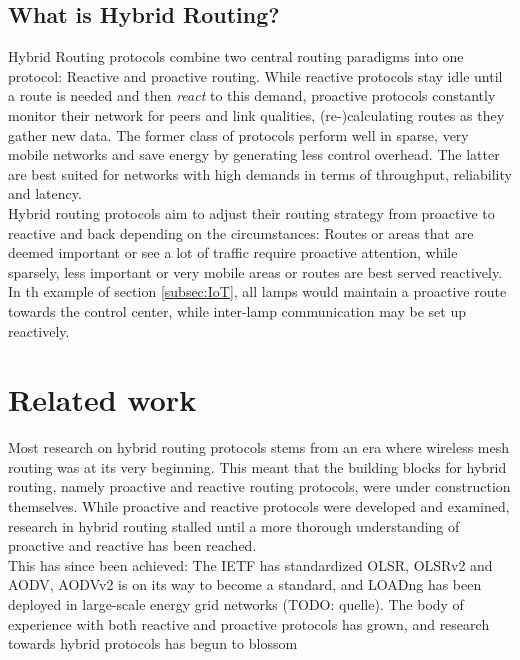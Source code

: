 \documentclass[a4paper,10pt]{scrartcl}
\begin{document}
\subsection{What is Hybrid Routing?}
\label{subsec:hybrid}
Hybrid Routing protocols combine two central routing paradigms into one protocol: Reactive and proactive routing. While reactive protocols stay idle until a route is needed and then \emph{react} to this demand, proactive protocols constantly monitor their network for peers and link qualities, (re-)calculating routes as they gather new data. The former class of protocols perform well in sparse, very mobile networks and save energy by generating less control overhead. The latter are best suited for networks with high demands in terms of throughput, reliability and latency.\\
Hybrid routing protocols aim to adjust their routing strategy from proactive to reactive and back depending on the circumstances: Routes or areas that are deemed important or see a lot of traffic require proactive attention, while sparsely, less important or very mobile areas or routes are best served reactively.\\
In th example of section \ref{subsec:IoT}, all lamps would maintain a proactive route towards the control center, while inter-lamp communication may be set up reactively.

\section{Related work}
\label{sec:related_work}

Most research on hybrid routing protocols stems from an era where wireless mesh routing was at its very beginning. This meant that the building blocks for hybrid routing, namely proactive and reactive routing protocols, were under construction themselves. While proactive and reactive protocols were developed and examined, research in hybrid routing stalled until a more thorough understanding of proactive and reactive has been reached.\\
This has since been achieved: The \gls{IETF} has standardized \gls{OLSR}, OLSRv2  and \gls{AODV}, AODVv2 is on its way to become a standard, and \gls{LOADng} has been deployed in large-scale energy grid networks (TODO: quelle). The body of experience with both reactive and proactive protocols has grown, and research towards hybrid protocols has begun to blossom \cite{baccelli_p2p_rpl} \cite{HYMAD}\\
\end{document}
